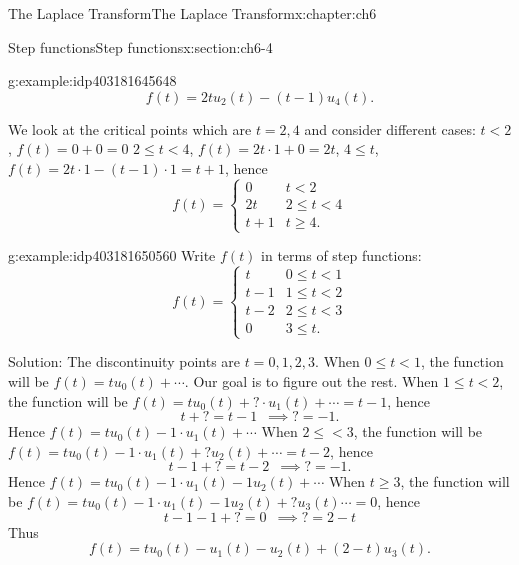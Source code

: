 \documentclass[oneside,10pt,]{book}
\numberwithin{equation}{section}
\numberwithin{equation}{section}
\newcommand{\lt}{<}
\newcommand{\amp}{&}
\begin{document}
\begin{chapterptx}{The Laplace Transform}{}{The Laplace Transform}{}{}{x:chapter:ch6}
\begin{sectionptx}{Step functions}{}{Step functions}{}{}{x:section:ch6-4}
\begin{example}{}{g:example:idp403181645648}
\begin{equation*}
f(t)=2tu_{2}(t)-(t-1)u_{4}(t).
\end{equation*}
%
\par
We look at the critical points which are \(t=2,4\) and consider different cases: \(t\lt2\), \(f(t)=0+0=0\) \(2\leq t\lt4\), \(f(t)=2t\cdot1+0=2t\), \(4\leq t\), \(f(t)=2t\cdot1-(t-1)\cdot1=t+1\), hence%
\begin{equation*}
f(t)=\begin{cases}
0 \amp t\lt 2\\
2t \amp 2\leq t \lt 4\\
t+1 \amp t\geq4.
\end{cases}
\end{equation*}
%
\end{example}
\begin{example}{}{g:example:idp403181650560}%
Write \(f(t)\) in terms of step functions:%
\begin{equation*}
f(t)=\begin{cases}
t \amp 0\leq t\lt 1\\
t-1 \amp 1\leq t\lt 2\\
t-2 \amp 2\leq t\lt 3\\
0 \amp 3\leq t.
\end{cases}
\end{equation*}
%
\par
Solution: The discontinuity points are \(t=0,1,2,3\). When \(0\leq t\lt 1\), the function will be \(f(t)=tu_{0}(t)+\cdots\). Our goal is to figure out the rest. When \(1\leq t\lt 2\), the function will be \(f(t)=tu_{0}(t)+\boldsymbol{?}\cdot u_{1}(t)+\cdots=t-1\), hence%
\begin{equation*}
t+?=t-1\,\,\,\implies?=-1.
\end{equation*}
Hence \(f(t)=tu_{0}(t)-1\cdot u_{1}(t)+\cdots\) When \(2\leq \lt 3\), the function will be \(f(t)=tu_{0}(t)-1\cdot u_{1}(t)+\boldsymbol{?}u_{2}(t)+\cdots=t-2\), hence%
\begin{equation*}
t-1+?=t-2\,\,\,\implies?=-1.
\end{equation*}
Hence \(f(t)=tu_{0}(t)-1\cdot u_{1}(t)-1u_{2}(t)+\cdots\) When \(t\geq3\), the function will be \(f(t)=tu_{0}(t)-1\cdot u_{1}(t)-1u_{2}(t)+\boldsymbol{?}u_{3}(t)\cdots=0\), hence%
\begin{equation*}
t-1-1+?=0\,\,\,\implies?=2-t
\end{equation*}
Thus%
\begin{equation*}
f(t)=tu_{0}(t)-u_{1}(t)-u_{2}(t)+(2-t)u_{3}(t).
\end{equation*}

\end{example}
\end{sectionptx}
\end{chapterptx}
\end{document}
